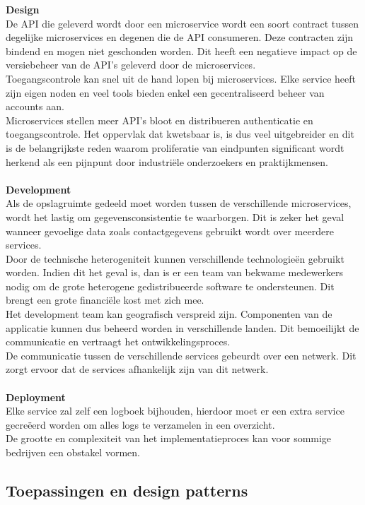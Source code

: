 \textbf{Design} \\De API die geleverd wordt door een microservice wordt een soort contract tussen degelijke microservices en degenen die de API consumeren. Deze contracten zijn bindend en mogen niet geschonden worden. Dit heeft een negatieve impact op de versiebeheer van de API's geleverd door de microservices.\\    Toegangscontrole kan snel uit de hand lopen bij microservices. Elke service heeft zijn eigen noden en veel tools bieden enkel een gecentraliseerd beheer van accounts aan.\\    Microservices stellen meer API's bloot en distribueren authenticatie en toegangscontrole. Het oppervlak dat kwetsbaar is, is dus veel uitgebreider en dit is de belangrijkste reden waarom proliferatie van eindpunten significant wordt herkend als een pijnpunt door industriële onderzoekers en praktijkmensen.\\  \\
\textbf{Development} \\ Als de opslagruimte gedeeld moet worden tussen de verschillende microservices, wordt het lastig om gegevensconsistentie te waarborgen. Dit is zeker het geval wanneer gevoelige data zoals contactgegevens gebruikt wordt over meerdere services.\\
Door de technische heterogeniteit kunnen verschillende technologieën gebruikt worden. Indien dit het geval is, dan is er een team van bekwame medewerkers nodig om de grote heterogene gedistribueerde software te ondersteunen. Dit brengt een grote financiële kost met zich mee.\\
Het development team kan geografisch verspreid zijn. Componenten van de applicatie kunnen dus beheerd worden in verschillende landen. Dit bemoeilijkt de communicatie en vertraagt het ontwikkelingsproces.\\
De communicatie tussen de verschillende services gebeurdt over een netwerk. Dit zorgt ervoor dat de services afhankelijk zijn van dit netwerk.\\ \\
\textbf{Deployment} \\ Elke service zal zelf een logboek bijhouden, hierdoor moet er een extra service gecreëerd worden om alles logs te verzamelen in een overzicht.\\
De grootte en complexiteit van het implementatieproces kan voor sommige bedrijven een obstakel vormen.

\subsection{Toepassingen en design patterns}

